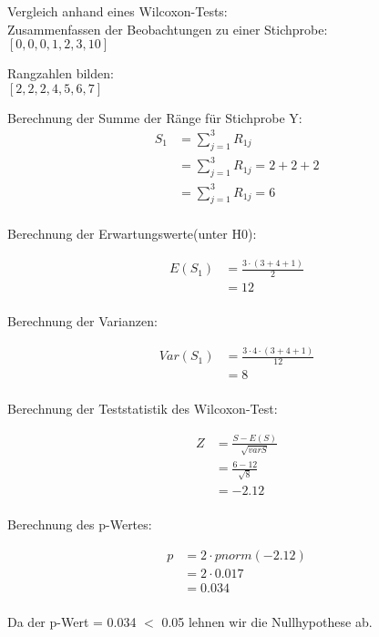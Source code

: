\documentclass[a4paper,12pt]{article}
\begin{document}
Vergleich anhand eines Wilcoxon-Tests:\\

Zusammenfassen der Beobachtungen zu einer Stichprobe: \\

$[0,0,0,1,2,3,10]$

Rangzahlen bilden: \\

$[2,2,2,4,5,6,7]$


Berechnung der Summe der Ränge für Stichprobe Y:
\begin{align*}
S_1 
&= \sum_{j=1}^{3} R_{1j} \\
&= \sum_{j=1}^{3} R_{1j} = 2+2+2 \\
&= \sum_{j=1}^{3} R_{1j} = 6	\\
\end{align*}

Berechnung der Erwartungswerte(unter H0):

\begin{align*}
E(S_1)
&= \frac{3\cdot(3+4+1)}{2} \\
&= 12 \\
\end{align*}


Berechnung der Varianzen:

\begin{align*}
Var(S_1)
&= \frac{3\cdot 4 \cdot (3+4+1)}{12} \\
&=  8 \\
\end{align*}


Berechnung der Teststatistik des Wilcoxon-Test:

\begin{align*}
Z
&= \frac{S-E(S)}{\sqrt{varS}} \\
&= \frac{6-12}{\sqrt{8}}  \\
&= -2.12 \\
\end{align*}

Berechnung des p-Wertes:

\begin{align*}
p
&= 2 \cdot pnorm(-2.12) \\
&= 2 \cdot 0.017  \\
&= 0.034 \\
\end{align*}

Da der p-Wert = 0.034 $<$ 0.05 lehnen wir die Nullhypothese ab.\\\\
\end{document}

